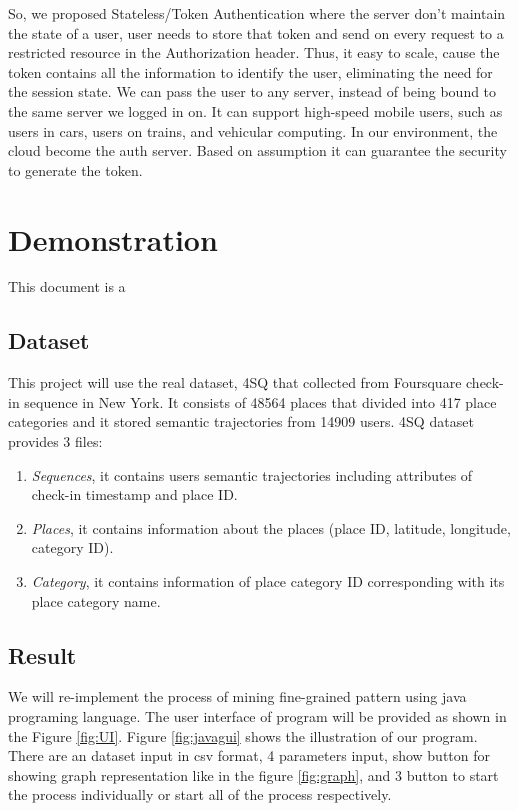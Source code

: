 \documentclass[conference]{IEEEtran}
\begin{document}
So, we proposed Stateless/Token Authentication where the server don't maintain the state of a user, user needs to store that token and send on every request to a restricted resource in the Authorization header. Thus, it easy to scale, cause the token contains all the information to identify the user, eliminating the need for the session state. We can pass the user to any server, instead of being bound to the same server we logged in on.
It can support high-speed mobile users, such as users in cars, users on trains, and vehicular computing. In our environment, the cloud become the auth server. Based on assumption it can guarantee the security to generate the token.

\section{Demonstration}
This document is a

\subsection{Dataset}
This project will use the real dataset, 4SQ that collected from Foursquare check-in sequence in New York. It consists of 48564 places that divided into 417 place categories and it stored semantic trajectories from 14909 users. 4SQ dataset provides 3 files:
\begin{enumerate}
\item \textit{Sequences}, it contains users semantic trajectories including attributes of check-in timestamp and place ID.
\item \textit{Places}, it contains information about the places (place ID, latitude, longitude, category ID).
\item \textit{Category}, it contains information of place category ID corresponding with its place category name.
\end{enumerate}

\subsection{Result}
We will re-implement the process of mining fine-grained pattern using java programing language. The user interface of program will be provided as shown in the Figure \ref{fig:UI}. Figure \ref{fig:javagui} shows the illustration of our program. There are an dataset input in csv format, 4 parameters input,  show button for showing graph representation like in the figure \ref{fig:graph}, and 3 button to start the process individually or start all of the process respectively. 
\end{document}
